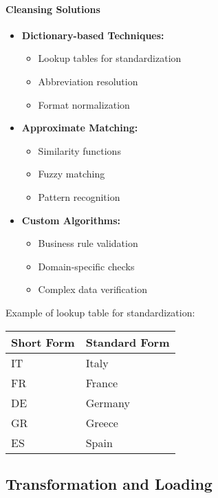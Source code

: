 \documentclass[a4paper,11pt]{article}
\newcommand{\note}[1]{
  \begin{tcolorbox}[colback=green!5,colframe=green!40!black,title=Note]
    #1
  \end{tcolorbox}
}
\begin{document}
\paragraph{Cleansing Solutions}
\begin{itemize}
    \item \textbf{Dictionary-based Techniques:}
        \begin{itemize}
            \item Lookup tables for standardization
            \item Abbreviation resolution
            \item Format normalization
        \end{itemize}
    \item \textbf{Approximate Matching:}
        \begin{itemize}
            \item Similarity functions
            \item Fuzzy matching
            \item Pattern recognition
        \end{itemize}
    \item \textbf{Custom Algorithms:}
        \begin{itemize}
            \item Business rule validation
            \item Domain-specific checks
            \item Complex data verification
        \end{itemize}
\end{itemize}

\note{
Example of lookup table for standardization:
\begin{center}
\begin{tabular}{|l|l|}
    \hline
    \textbf{Short Form} & \textbf{Standard Form} \\
    \hline
    IT & Italy \\
    FR & France \\
    DE & Germany \\
    GR & Greece \\
    ES & Spain \\
    \hline
\end{tabular}
\end{center}
}

\subsection{Transformation and Loading}
\end{document}
